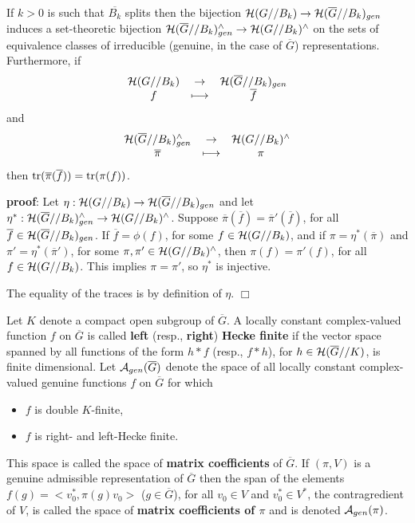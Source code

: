 \begin{corollary}
\label{corollary:main}
If $k>0$ is such that $\overline{B_k}$ splits then the bijection
${\cal H}(G//B_k)\rightarrow {\cal H}(\overline{G}//B_k)_{gen}$
induces a set-theoretic 
bijection ${\cal H}(\overline{G}//B_k)_{gen}^\wedge
\rightarrow {\cal H}(G//B_k)^\wedge$ on the sets of equivalence
classes of irreducible (genuine, in the case of $\overline{G}$)
representations. Furthermore, if
\[
\begin{array}{ccc}
{\cal H}(G//B_k)&\rightarrow &{\cal H}(\overline{G}//B_k)_{gen}\\
f & \longmapsto &\overline{f}
\end{array}
\]
and 
\[
\begin{array}{ccc}
{\cal H}(\overline{G}//B_k)_{gen}^\wedge 
  &\rightarrow &{\cal H}(G//B_k)^\wedge\\
\overline{\pi}&\longmapsto &\pi
\end{array}
\]
then ${\rm tr}(\overline{\pi}(\overline{f}))={\rm tr}(\pi(f))$.
\end{corollary}

{\bf proof}: Let
$\eta:{\cal H}(G//B_k)\rightarrow {\cal H}(\overline{G}//B_k)_{gen}$
and let $\eta^*:{\cal H}(\overline{G}//B_k)_{gen}^\wedge
\rightarrow {\cal H}(G//B_k)^\wedge$. Suppose
$\overline{\pi}(\overline{f})=\overline{\pi}'(\overline{f})$,
for all $\overline{f}\in {\cal H}(\overline{G}//B_k)_{gen}$. If 
$\overline{f}=\phi(f)$, for some $f\in {\cal H}(G//B_k)$,
and if $\pi=\eta^*(\overline{\pi})$ and $\pi'=\eta^*(\overline{\pi}')$, 
for some $\pi,\pi'\in {\cal H}(G//B_k)^\wedge$, then 
$\pi(f)=\pi'(f)$, for all $f\in {\cal H}(G//B_k)$.
This implies $\pi=\pi'$, so $\eta^*$ is injective.

The equality of the traces is by definition of $\eta$. $\Box$ 

\begin{definition} 
Let $K$ denote a compact open subgroup of $\overline{G}$.
A locally constant
complex-valued function $f$ on $\overline{G}$
is called {\bf left} (resp., {\bf right}) {\bf Hecke finite}
if the vector space spanned by all functions of the form
$h*f$ (resp., $f*h$), for $h\in {\cal H}(\overline{G}//K)$,
is finite dimensional. Let ${\cal A}_{gen}(\overline{G})$
denote the space of all locally constant
complex-valued genuine functions
$f$ on $\overline{G}$ for which
\begin{itemize}
\item
$f$ is double $K$-finite,
\item
$f$ is right- and left-Hecke finite. 
\end{itemize}
This space is called the space of {\bf matrix
coefficients} of $\overline{G}$.
If $(\pi,V)$ is a genuine admissible representation
of $\overline{G}$ then the span of the
elements $f(g)=<v_0^*,\pi(g)v_0>$ ($g\in \overline{G}$),
for all $v_0\in V$ and $v_0^*\in V^*$,
the contragredient of $V$, is called the space 
of {\bf matrix coefficients of $\pi$} and is
denoted ${\cal A}_{gen}(\pi)$.
\end{definition}

